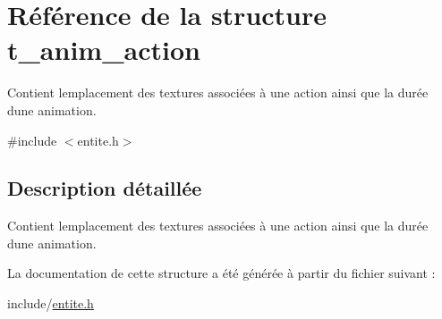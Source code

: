 \hypertarget{structt__anim__action}{}\section{Référence de la structure t\+\_\+anim\+\_\+action}
\label{structt__anim__action}


Contient l\textquotesingle{}emplacement des textures associées à une action ainsi que la durée d\textquotesingle{}une animation.  




{\ttfamily \#include $<$entite.\+h$>$}



\subsection{Description détaillée}
Contient l\textquotesingle{}emplacement des textures associées à une action ainsi que la durée d\textquotesingle{}une animation. 

La documentation de cette structure a été générée à partir du fichier suivant \+:\begin{DoxyCompactItemize}
\item 
include/\hyperlink{entite_8h}{entite.\+h}\end{DoxyCompactItemize}
